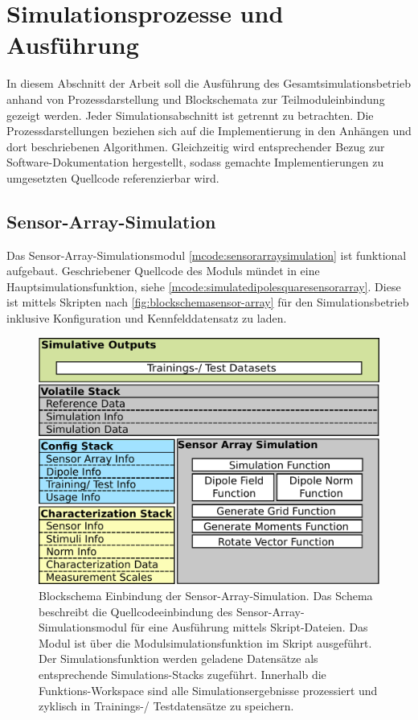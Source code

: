 %

\section{Simulationsprozesse und Ausführung}\label{sec:sim-pro}


In diesem Abschnitt der Arbeit soll die Ausführung des Gesamtsimulationsbetrieb anhand von Prozessdarstellung und Blockschemata zur Teilmoduleinbindung gezeigt werden. Jeder Simulationsabschnitt ist getrennt zu betrachten. Die Prozessdarstellungen beziehen sich auf die Implementierung in den Anhängen und dort beschriebenen Algorithmen. Gleichzeitig wird entsprechender Bezug zur Software-Dokumentation hergestellt, sodass gemachte Implementierungen zu umgesetzten Quellcode referenzierbar wird.


\subsection{Sensor-Array-Simulation}\label{sub:sensor-array-pro}


Das Sensor-Array-Simulationsmodul \autoref{mcode:sensorarraysimulation} ist funktional aufgebaut. Geschriebener Quellcode des Moduls mündet in eine Hauptsimulationsfunktion, siehe \autoref{mcode:simulatedipolesquaresensorarray}. Diese ist mittels Skripten nach \autoref{fig:blockschemasensor-array} für den Simulationsbetrieb inklusive Konfiguration und Kennfelddatensatz zu laden.

\vspace{3mm}
\begin{figure}[bph]
	\centering
	\includegraphics[width=0.7\linewidth]{chapters/images/3-SW-E-OExp/Blockschema_Sensor-Array}
	\caption[Blockschema Einbindung der Sensor-Array-Simulation]{Blockschema Einbindung der Sensor-Array-Simulation. Das Schema beschreibt die Quellcodeeinbindung des Sensor-Array-Simulationsmodul für eine Ausführung mittels Skript-Dateien. Das Modul ist über die Modulsimulationsfunktion im Skript ausgeführt. Der Simulationsfunktion werden geladene Datensätze als entsprechende Simulations-Stacks zugeführt. Innerhalb die Funktions-Workspace sind alle Simulationsergebnisse prozessiert und zyklisch in Trainings-/ Testdatensätze zu speichern.}
	\label{fig:blockschemasensor-array}
\end{figure}


